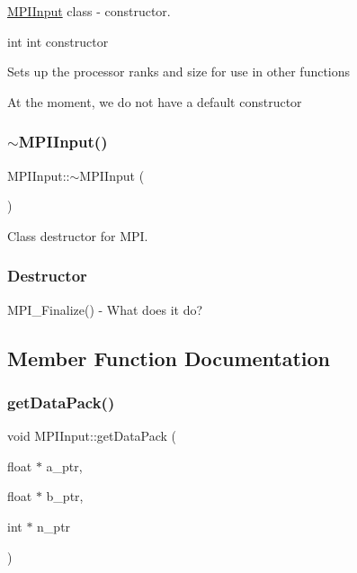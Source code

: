 \hyperlink{classMPIInput}{M\+P\+I\+Input} class -\/ constructor. 

int int constructor

Sets up the processor ranks and size for use in other functions

At the moment, we do not have a default constructor \mbox{\label{classMPIInput_ac29d1da098f24e53d405551b056a1893}} 
\subsubsection{\texorpdfstring{$\sim$\+M\+P\+I\+Input()}{~MPIInput()}}
{\footnotesize\ttfamily M\+P\+I\+Input\+::$\sim$\+M\+P\+I\+Input (\begin{DoxyParamCaption}{ }\end{DoxyParamCaption})}



Class destructor for M\+PI. 

\subsubsection*{Destructor }

M\+P\+I\+\_\+\+Finalize() -\/ What does it do? 

\subsection{Member Function Documentation}
\mbox{\label{classMPIInput_a2f62ee6db67ef581bc7331512a50f2c1}} 
\subsubsection{\texorpdfstring{get\+Data\+Pack()}{getDataPack()}}
{\footnotesize\ttfamily void M\+P\+I\+Input\+::get\+Data\+Pack (\begin{DoxyParamCaption}\item[{float $\ast$}]{a\+\_\+ptr,  }\item[{float $\ast$}]{b\+\_\+ptr,  }\item[{int $\ast$}]{n\+\_\+ptr }\end{DoxyParamCaption})}

